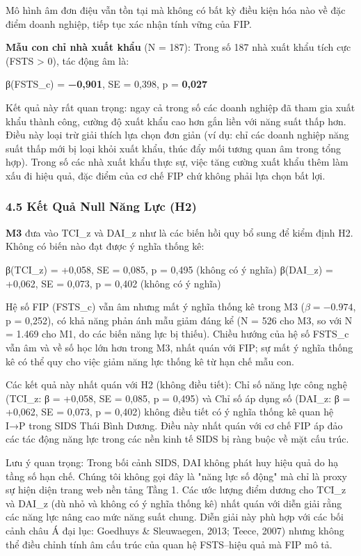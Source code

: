 \documentclass[12pt,a4paper]{article}
\begin{document}
Mô hình âm đơn điệu vẫn tồn tại mà không có bất kỳ điều kiện hóa nào về
đặc điểm doanh nghiệp, tiếp tục xác nhận tính vững của FIP.

\textbf{Mẫu con chỉ nhà xuất khẩu} (N = 187): Trong số 187 nhà xuất khẩu
tích cực (FSTS \textgreater{} 0), tác động âm là:

β(FSTS\_c) = \textbf{−0,901}, SE = 0,398, p = \textbf{0,027}

Kết quả này rất quan trọng: ngay cả trong số các doanh nghiệp đã tham
gia xuất khẩu thành công, cường độ xuất khẩu cao hơn gắn liền với năng
suất thấp hơn. Điều này loại trừ giải thích lựa chọn đơn giản (ví dụ:
chỉ các doanh nghiệp năng suất thấp mới bị loại khỏi xuất khẩu, thúc đẩy
mối tương quan âm trong tổng hợp). Trong số các nhà xuất khẩu thực sự,
việc tăng cường xuất khẩu thêm làm xấu đi hiệu quả, đặc điểm của cơ chế
FIP chứ không phải lựa chọn bất lợi.

\hypertarget{45-kux1ebft-quux1ea3-null-nux103ng-lux1ef1c-h2}{%
\subsubsection{4.5 Kết Quả Null Năng Lực
(H2)}\label{45-kux1ebft-quux1ea3-null-nux103ng-lux1ef1c-h2}}

\textbf{M3} đưa vào TCI\_z và DAI\_z như là các biến hồi quy bổ sung để
kiểm định H2. Không có biến nào đạt được ý nghĩa thống kê:

β(TCI\_z) = +0,058, SE = 0,085, p = 0,495 (không có ý nghĩa) β(DAI\_z) =
+0,062, SE = 0,073, p = 0,402 (không có ý nghĩa)

Hệ số FIP (FSTS\_c) vẫn âm nhưng mất ý nghĩa thống kê trong M3
(\(\beta = −0.974\), p = 0,252), có khả năng phản ánh mẫu giảm đáng kể
(N = 526 cho M3, so với N = 1.469 cho M1, do các biến năng lực bị
thiếu). Chiều hướng của hệ số FSTS\_c vẫn âm và về số học lớn hơn trong
M3, nhất quán với FIP; sự mất ý nghĩa thống kê có thể quy cho việc giảm
năng lực thống kê từ hạn chế mẫu con.

Các kết quả này nhất quán với H2 (không điều tiết): Chỉ số năng lực công
nghệ (TCI\_z: β = +0,058, SE = 0,085, p = 0,495) và Chỉ số áp dụng số
(DAI\_z: β = +0,062, SE = 0,073, p = 0,402) không điều tiết có ý nghĩa
thống kê quan hệ I→P trong SIDS Thái Bình Dương. Điều này nhất quán với
cơ chế FIP áp đảo các tác động năng lực trong các nền kinh tế SIDS bị
ràng buộc về mặt cấu trúc.

Lưu ý quan trọng: Trong bối cảnh SIDS, DAI không phát huy hiệu quả do hạ
tầng số hạn chế. Chúng tôi không gọi đây là "năng lực số động" mà chỉ là
proxy sự hiện diện trang web nền tảng Tầng 1. Các ước lượng điểm dương
cho TCI\_z và DAI\_z (dù nhỏ và không có ý nghĩa thống kê) nhất quán với
diễn giải rằng các năng lực nâng cao mức năng suất chung. Diễn giải này
phù hợp với các bối cảnh châu Á đại lục: Goedhuys \& Sleuwaegen, 2013;
Teece, 2007) nhưng không thể điều chỉnh tính âm cấu trúc của quan hệ
FSTS--hiệu quả mà FIP mô tả.
\end{document}
